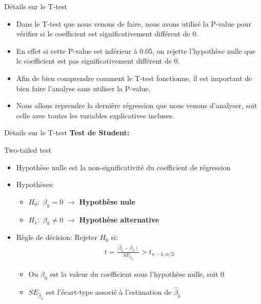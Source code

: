 \documentclass{beamer}
\begin{document}
\begin{frame}{Détails sur le T-test}

\begin{itemize}
\item Dans le T-test que nous venons de faire, nous avons utilisé la P-value pour vérifier si le coefficient est significativement différent de 0.
\item En effet si cette P-value est inférieur à 0.05, on rejette l’hypothèse nulle que le coefficient est pas significativement différent de 0.
\item Afin de bien comprendre comment le T-test fonctionne, il est important de bien faire l’analyse sans utiliser la P-value.
\item Nous allons reprendre la dernière régression que nous venons d’analyser, soit celle avec toutes les variables explicatives incluses.
\end{itemize}

\end{frame}

\begin{frame}{Détails sur le T-test}
\textbf{Test de Student:}
\begin{block}{Two-tailed test}
\begin{itemize}
\item Hypothèse nulle est la non-significativité du coefficient de régression
\item Hypothèses:
\begin{itemize}
\item $H_0:$ $\beta_k=0$ $\rightarrow$ \textbf{Hypothèse nule}
\item $H_1:$ $\beta_k \neq 0$ $\rightarrow$ \textbf{Hypothèse alternative}
\end{itemize}
\item Règle de décision:
Rejeter $H_0$ si:
\begin{align*}
t=\frac{\mid \hat{\beta}_k-\beta_0 \mid}{SE_{\hat{\beta}_k}} > t_{n-k,\alpha/2}
\end{align*}
\begin{itemize}
\item Ou $\beta_0$ est la valeur du coefficient sous l'hypothèse nulle, soit 0
\item $SE_{\hat{\beta}_k}$ est l'écart-type associé à l'estimation de $\hat{\beta}_k$
\end{itemize}
\end{itemize}
\end{block}

\end{frame}
\end{document}
